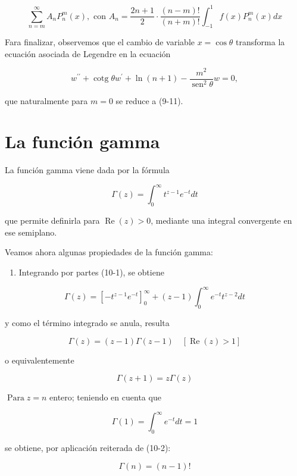 \documentclass[10pt]{article}
\theoremstyle{plain}
\theoremstyle{definition}
\theoremstyle{remark}
\begin{document}
$$
\sum_{n=m}^{\infty} A_{n} P_{n}^{m}(x), \text { con } A_{n}=\frac{2 n+1}{2} \cdot \frac{(n-m)!}{(n+m)!} \int_{-1}^{1} f(x) P_{n}^{m}(x) d x
$$

Fara finalizar, observemos que el cambio de variable $x=\cos \theta$ transforma la ecuación asociada de Legendre en la ecuación


\begin{equation*}
w^{\prime \prime}+\operatorname{cotg} \theta w^{\prime}+\ln (n+1)-\frac{m^{2}}{\operatorname{sen}^{2} \theta} w=0, \tag{9-16}
\end{equation*}


que naturalmente para $m=0$ se reduce a (9-11).

\section{La función gamma}
La función gamma viene dada por la fórmula


\begin{equation*}
\Gamma(z)=\int_{0}^{\infty} t^{z-1} e^{-t} d t \tag{10-1}
\end{equation*}


que permite definirla para $\operatorname{Re}(z)>0$, mediante una integral convergente en ese semiplano.

Veamos ahora algunas propiedades de la función gamma:

\begin{enumerate}
  \item Integrando por partes (10-1), se obtiene
\end{enumerate}

$$
\Gamma(z)=\left[-t^{z-1} e^{-t}\right]_{0}^{\infty}+(z-1) \int_{0}^{\infty} e^{-t} t^{z-2} d t
$$

y como el término integrado se anula, resulta

$$
\Gamma(z)=(z-1) \Gamma(z-1) \quad[\operatorname{Re}(z)>1]
$$

o equivalentemente


\begin{equation*}
\Gamma(z+1)=z \Gamma(z) \tag{Re}
\end{equation*}


$\operatorname{Para} z=n$ entero; teniendo en cuenta que

$$
\Gamma(1)=\int_{0}^{\infty} e^{-t} d t=1
$$

se obtiene, por aplicación reiterada de (10-2):

$$
\Gamma(n)=(n-1)!
$$
\end{document}
